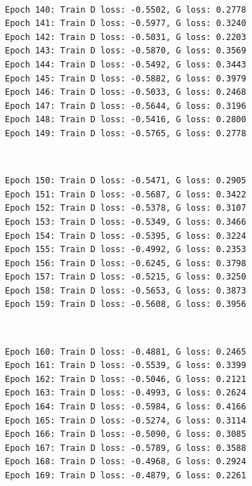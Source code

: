 \documentclass[11pt]{article}
\begin{document}
    \begin{center}
    \end{center}
    { \hspace*{\fill} \\}
    
    \begin{Verbatim}[commandchars=\\\{\}]
Epoch 140: Train D loss: -0.5502, G loss: 0.2778
Epoch 141: Train D loss: -0.5977, G loss: 0.3240
Epoch 142: Train D loss: -0.5031, G loss: 0.2203
Epoch 143: Train D loss: -0.5870, G loss: 0.3569
Epoch 144: Train D loss: -0.5492, G loss: 0.3443
Epoch 145: Train D loss: -0.5882, G loss: 0.3979
Epoch 146: Train D loss: -0.5033, G loss: 0.2468
Epoch 147: Train D loss: -0.5644, G loss: 0.3196
Epoch 148: Train D loss: -0.5416, G loss: 0.2800
Epoch 149: Train D loss: -0.5765, G loss: 0.2778

    \end{Verbatim}

    \begin{center}
    \end{center}
    { \hspace*{\fill} \\}
    
    \begin{Verbatim}[commandchars=\\\{\}]
Epoch 150: Train D loss: -0.5471, G loss: 0.2905
Epoch 151: Train D loss: -0.5687, G loss: 0.3422
Epoch 152: Train D loss: -0.5378, G loss: 0.3107
Epoch 153: Train D loss: -0.5349, G loss: 0.3466
Epoch 154: Train D loss: -0.5395, G loss: 0.3224
Epoch 155: Train D loss: -0.4992, G loss: 0.2353
Epoch 156: Train D loss: -0.6245, G loss: 0.3798
Epoch 157: Train D loss: -0.5215, G loss: 0.3250
Epoch 158: Train D loss: -0.5653, G loss: 0.3873
Epoch 159: Train D loss: -0.5608, G loss: 0.3956

    \end{Verbatim}

    \begin{center}
    \end{center}
    { \hspace*{\fill} \\}
    
    \begin{Verbatim}[commandchars=\\\{\}]
Epoch 160: Train D loss: -0.4881, G loss: 0.2465
Epoch 161: Train D loss: -0.5539, G loss: 0.3399
Epoch 162: Train D loss: -0.5046, G loss: 0.2121
Epoch 163: Train D loss: -0.4993, G loss: 0.2624
Epoch 164: Train D loss: -0.5984, G loss: 0.4166
Epoch 165: Train D loss: -0.5274, G loss: 0.3114
Epoch 166: Train D loss: -0.5090, G loss: 0.3085
Epoch 167: Train D loss: -0.5789, G loss: 0.3588
Epoch 168: Train D loss: -0.4968, G loss: 0.2924
Epoch 169: Train D loss: -0.4879, G loss: 0.2261

    \end{Verbatim}
\end{document}
